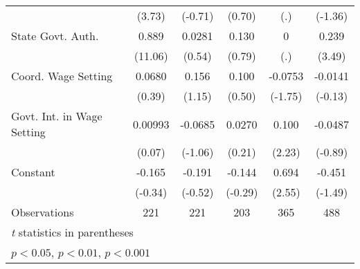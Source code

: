 \begin{table}[htbp]
\begin{tabular}{l*{5}{c}}
                                        &   (3.73)         &  (-0.71)         &   (0.70)         &      (.)         &  (-1.36)         \\
\addlinespace
State Govt. Auth.                       &    0.889\sym{***}&   0.0281         &    0.130         &        0         &    0.239\sym{**} \\
                                        &  (11.06)         &   (0.54)         &   (0.79)         &      (.)         &   (3.49)         \\
\addlinespace
Coord. Wage Setting                     &   0.0680         &    0.156         &    0.100         &  -0.0753         &  -0.0141         \\
                                        &   (0.39)         &   (1.15)         &   (0.50)         &  (-1.75)         &  (-0.13)         \\
\addlinespace
Govt. Int. in Wage Setting              &  0.00993         &  -0.0685         &   0.0270         &    0.100\sym{*}  &  -0.0487         \\
                                        &   (0.07)         &  (-1.06)         &   (0.21)         &   (2.23)         &  (-0.89)         \\
\addlinespace
Constant                                &   -0.165         &   -0.191         &   -0.144         &    0.694\sym{*}  &   -0.451         \\
                                        &  (-0.34)         &  (-0.52)         &  (-0.29)         &   (2.55)         &  (-1.49)         \\
\midrule
Observations                            &      221         &      221         &      203         &      365         &      488         \\
\bottomrule
\multicolumn{6}{l}{\footnotesize \textit{t} statistics in parentheses}\\
\multicolumn{6}{l}{\footnotesize \sym{*} \(p<0.05\), \sym{**} \(p<0.01\), \sym{***} \(p<0.001\)}\\
\end{tabular}
\end{table}
